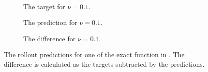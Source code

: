 \documentclass[preprint,12pt,times,authoryear]{elsarticle}
\begin{document}
\begin{figure}[hbp]
\begin{adjustwidth}{-0.1\linewidth}{-0.1\linewidth}
\begin{subfigure}{0.32\linewidth}
    \end{subfigure}
    \\[0.7\baselineskip]
    \begin{subfigure}{0.33\linewidth}
      \begin{adjustbox}{width=\linewidth}
        
      \end{adjustbox}
      \caption{The target for \(\nu=0.1\).}\label{fig:sc2_exact_target_0.1}
    \end{subfigure}
    \begin{subfigure}{0.33\linewidth}
      \begin{adjustbox}{width=\linewidth}
        
      \end{adjustbox}
      \caption{The prediction for \(\nu=0.1\).}\label{fig:sc2_exact_pred_0.1}
    \end{subfigure}
    \begin{subfigure}{0.32\linewidth}
      \begin{adjustbox}{width=\linewidth}
        
      \end{adjustbox}
      \caption{The difference for \(\nu=0.1\).}\label{fig:sc2_exact_diff_0.1}
    \end{subfigure}
  \end{adjustwidth}
  \caption{The rollout predictions for one of the exact function in . The difference is calculated as the targets subtracted by the predictions.}\label{fig:scenario_2_exact}
\end{figure}
\end{document}
